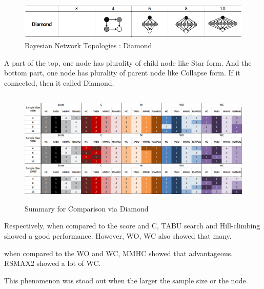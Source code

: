 	\begin{figure}[h]
	\centering
		\includegraphics[height=50pt]{images/Topologies_Diamond}
		\caption{Bayesian Network Topologies : Diamond}
	\end{figure}	

	A part of the top, one node has plurality of child node like Star form. And the bottom part, one node has plurality of parent node like Collapse form. If it connected, then it called Diamond.
	
\begin{figure}[!bhp]
	\centering
		\includegraphics[height=155pt]{images/Result_Diamond}
		\caption{Summary for Comparison via Diamond}
	\end{figure}	

Respectively, when compared to the score and C,  TABU search and Hill-climbing showed a good performance. However, WO, WC also showed that many.

when compared to the WO and WC, MMHC showed that advantageous. RSMAX2 showed a lot of WC.

This phenomenon was stood out when the larger the sample size or the node.
	
